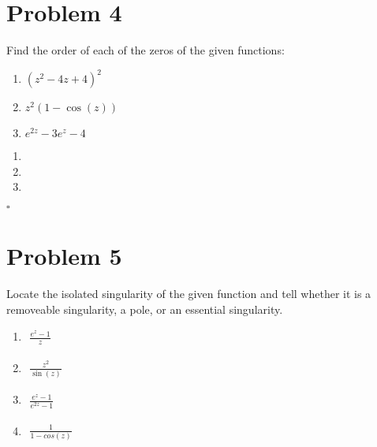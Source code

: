 \documentclass[12pt]{article}
\newenvironment{proof}{\noindent{\bf Proof.}}{\hfill $\square$\medskip}
\begin{document}
\newpage
\section{Problem 4}
Find the order of each of the zeros of the given functions:
\begin{enumerate}[label=\textbf{(\alph*)}]
    \item $(z^{2}-4z+4)^{2}$
    \item $z^{2}(1-\cos(z))$
    \item $e^{2z}-3e^{z}-4$
\end{enumerate}

\begin{proof}
    \begin{enumerate}[label=\textbf{(\alph*)}]
        \item
        \item
        \item
    \end{enumerate}
\end{proof}


\newpage
\section{Problem 5}
Locate the isolated singularity of the given function and tell whether it is a removeable singularity, a pole, or an essential singularity.
\begin{enumerate}[label=\textbf{(\alph*)}]
    \item
          \begin{flushleft}
              $\begin{aligned}
                      \frac{e^{z}-1}{z}
                  \end{aligned}$
          \end{flushleft}
    \item
          \begin{flushleft}
              $\begin{aligned}
                      \frac{z^{2}}{\sin(z)}
                  \end{aligned}$
          \end{flushleft}
    \item
          \begin{flushleft}
              $\begin{aligned}
                      \frac{e^{z}-1}{e^{2z}-1}
                  \end{aligned}$
          \end{flushleft}
    \item
          \begin{flushleft}
              $\begin{aligned}
                      \frac{1}{1-cos(z)}
                  \end{aligned}$
          \end{flushleft}
\end{enumerate}
\end{document}

